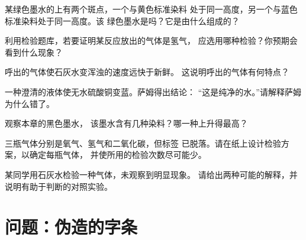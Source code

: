 \begin{exercise}[$\star\star$]\label{exo:g7:identifying-substances:6}
某绿色墨水的上有两个斑点，一个与黄色标准染料
处于同一高度，另一个与蓝色标准染料处于同一高度。该
绿色墨水是吗？它是由什么组成的？
\end{exercise}

\begin{exercise}[$\star\star$]\label{exo:g7:identifying-substances:7}
利用检验题库，若要证明某反应放出的气体是氢气，
应选用哪种检验？你预期会看到什么现象？
\end{exercise}

\begin{exercise}[$\star\star$]\label{exo:g7:identifying-substances:8}
呼出的气体使石灰水变浑浊的速度远快于新鲜。
这说明呼出的气体有何特点？
\end{exercise}

\begin{exercise}[$\star\star$]\label{exo:g7:identifying-substances:9}
一种澄清的液体使无水硫酸铜变蓝。萨姆得出结论：
“这是纯净的水。”请解释萨姆为什么错了。
\end{exercise}

\begin{exercise}[$\star\star$]\label{exo:g7:identifying-substances:10}
观察本章的黑色墨水，
该墨水含有几种染料？哪一种上升得最高？
\end{exercise}

\begin{exercise}[$\star\star\star$]\label{exo:g7:identifying-substances:11}
三瓶气体分别是氧气、氢气和二氧化碳，但标签
已脱落。请在纸上设计检验方案，以确定每瓶气体，
并使所用的检验次数尽可能少。
\end{exercise}

\begin{exercise}[$\star\star\star$]\label{exo:g7:identifying-substances:12}
某同学用石灰水检验一种气体，未观察到明显现象。
请给出两种可能的解释，并说明有助于判断的对照实验。
\end{exercise}

\section{问题：伪造的字条}

